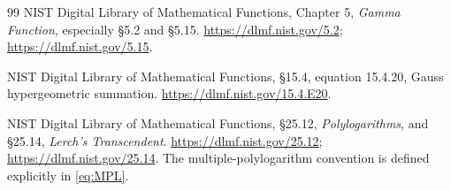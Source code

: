 \begin{thebibliography}{99}
NIST Digital Library of Mathematical Functions,
Chapter 5, \emph{Gamma Function}, especially \S5.2 and \S5.15.
\url{https://dlmf.nist.gov/5.2}; \url{https://dlmf.nist.gov/5.15}.

NIST Digital Library of Mathematical Functions,
\S15.4, equation 15.4.20, Gauss hypergeometric summation.
\url{https://dlmf.nist.gov/15.4.E20}.

NIST Digital Library of Mathematical Functions,
\S25.12, \emph{Polylogarithms}, and \S25.14, \emph{Lerch's Transcendent}.
\url{https://dlmf.nist.gov/25.12}; \url{https://dlmf.nist.gov/25.14}.
The multiple-polylogarithm convention is defined explicitly in
\eqref{eq:MPL}.

\end{thebibliography}
